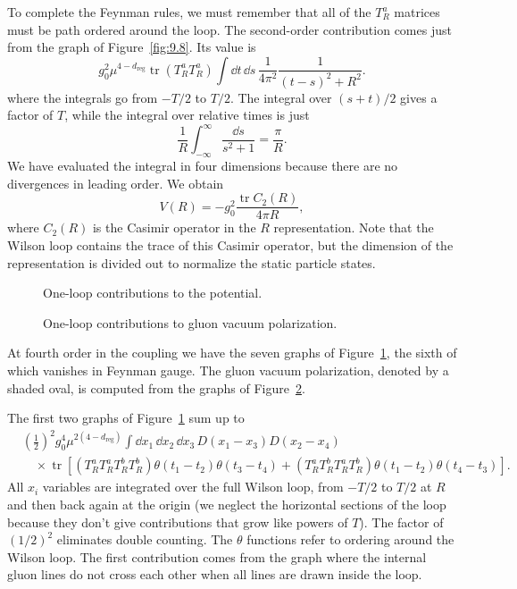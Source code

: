 To complete the Feynman rules, we must remember that all of the $T_R^a$
matrices must be path ordered around the loop. The second-order contribution
comes just from the graph of Figure~\ref{fig:9.8}. Its value is
\begin{equation}
  g_0^2\mu^{4-d_{\mathrm{reg}}}\operatorname{tr}(T_R^aT_R^a)
  \int\dd t\,\dd s\,\frac{1}{4\pi^2}\frac{1}{(t-s)^2+R^2}.
  \label{eq:9.3}
\end{equation}
where the integrals go from $-T/2$ to $T/2$. The integral over $(s+t)/2$ gives
a factor of $T$, while the integral over relative times is just
\[
  \frac{1}{R}\int_{-\infty}^{\infty}\frac{\dd s}{s^2+1}=\frac{\pi}{R}.
\]
We have evaluated the integral in four dimensions because there are no
divergences in leading order. We obtain
\[
  V(R)=-g_0^2\frac{\operatorname{tr}C_2(R)}{4\pi R},
\]
where $C_2(R)$ is the Casimir operator in the $R$ representation. Note that
the Wilson loop contains the trace of this Casimir operator, but the dimension
of the representation is divided out to normalize the static particle states.

\begin{figure}[htbp]
  \centering
  
  \caption{One-loop contributions to the potential.}
  \label{fig:9.9}
\end{figure}

\begin{figure}[htbp]
  \centering
  
  \caption{One-loop contributions to gluon vacuum polarization.}
  \label{fig:9.10}
\end{figure}

At fourth order in the coupling we have the seven graphs of Figure~\ref{fig:9.9},
the sixth of which vanishes in Feynman gauge. The gluon vacuum polarization,
denoted by a shaded oval, is computed from the graphs of Figure~\ref{fig:9.10}.

The first two graphs of Figure~\ref{fig:9.9} sum up to
\[
\begin{aligned}
&\left(\frac12\right)^2g_0^4\mu^{2(4-d_{\mathrm{reg}})}
 \int\dd x_1\,\dd x_2\,\dd x_3\,
 D(x_1-x_3)D(x_2-x_4)\\[-2pt]
&\quad\times\operatorname{tr}\!\left[
 (T_R^aT_R^aT_R^bT_R^b)\theta(t_1-t_2)\theta(t_3-t_4)
 +(T_R^aT_R^bT_R^aT_R^b)\theta(t_1-t_2)\theta(t_4-t_3)\right].
\end{aligned}
\]
All $x_i$ variables are integrated over the full Wilson loop, from $-T/2$ to
$T/2$ at $R$ and then back again at the origin (we neglect the horizontal
sections of the loop because they don't give contributions that grow like
powers of $T$). The factor of $(1/2)^2$ eliminates double counting. The
$\theta$ functions refer to ordering around the Wilson loop. The first
contribution comes from the graph where the internal gluon lines do not cross
each other when all lines are drawn inside the loop.

